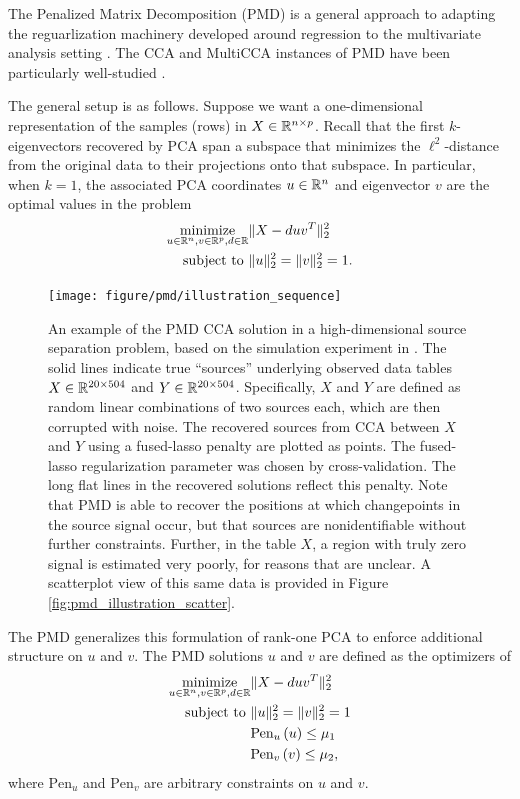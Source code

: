 \documentclass[14pt]{extarticle}
\begin{document}
The Penalized Matrix Decomposition (PMD) is a general approach to adapting the
reguarlization machinery developed around regression to the multivariate
analysis setting \citep{witten2009penalized}. The CCA and MultiCCA instances of
PMD have been particularly well-studied \citep{witten2009penalized,
  witten2013package}.

The general setup is as follows. Suppose we want a one-dimensional
representation of the samples (rows) in $X \in \mathbb{R}^{n \times p}$. Recall that
the first $k$-eigenvectors recovered by PCA span a subspace that minimizes the
$\ell^{2}$-distance from the original data to their projections onto that
subspace. In particular, when $k = 1$, the associated PCA coordinates $u \in
\mathbb{R}^{n}$ and eigenvector $v$ are the optimal values in the problem
\begin{align*}
  \mathop\mathrm{minimize}_{u \in \mathbb{R}^{n}, v \in \mathbb{R}^{p}, d \in \mathbb{R}} &\|X - duv^{T}\|_{2}^{2} \\
  \text{subject to } &\|u\|_{2}^{2} = \|v\|_{2}^{2} = 1.
\end{align*}

\begin{figure}
  \centering
  \texttt{[image: figure/pmd/illustration\_sequence]}
  \caption{An example of the PMD CCA solution in a high-dimensional source
    separation problem, based on the simulation experiment in
    \citep{witten2009penalized}. The solid lines indicate true ``sources''
    underlying observed data tables $X \in \mathbb{R}^{20 \times 504}$ and $Y \in
    \mathbb{R}^{20 \times 504}$. Specifically, $X$ and $Y$ are defined as random
    linear combinations of two sources each, which are then corrupted with
    noise. The recovered sources from CCA between $X$ and $Y$ using a
    fused-lasso penalty are plotted as points. The fused-lasso regularization
    parameter was chosen by cross-validation. The long flat lines in the
    recovered solutions reflect this penalty. Note that PMD is able to recover
    the positions at which changepoints in the source signal occur, but that
    sources are nonidentifiable without further constraints. Further, in the
    table $X$, a region with truly zero signal is estimated very poorly, for
    reasons that are unclear. A scatterplot view of this same data is provided
    in Figure
    \ref{fig:pmd_illustration_scatter}. \label{fig:pmd_illustration_sequence}}
\end{figure}

The PMD generalizes this formulation of rank-one PCA to enforce additional
structure on $u$ and $v$. The PMD solutions $u$ and $v$ are defined as the
optimizers of
\begin{align}
\label{eq:pmd_opt} \mathop\mathrm{minimize}_{u \in \mathbb{R}^{n}, v \in \mathbb{R}^{p}, d
  \in \mathbb{R}} &\|X - duv^{T}\|_{2}^{2} \\
  \text{subject to } &\|u\|_{2}^{2} = \|v\|_{2}^{2} = 1 \nonumber \\
  & \text{Pen}_{u}\left(u\right) \leq \mu_{1} \nonumber \\
  & \text{Pen}_{v}\left(v\right) \leq \mu_{2}, \nonumber
\end{align}
where $\text{Pen}_u$ and $\text{Pen}_v$ are arbitrary constraints on $u$ and
$v$.
\end{document}
